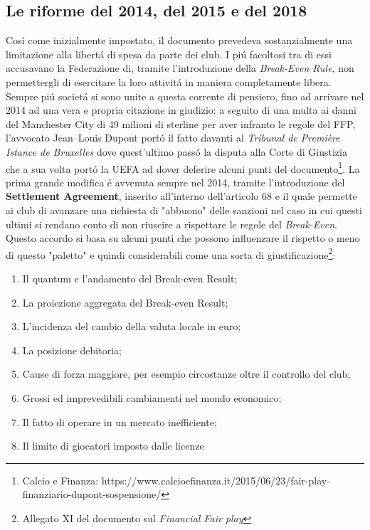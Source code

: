 \documentclass[
    corpo=12pt,
    oneside,
    evenboxes,
    tipotesi=triennale,
    stile=classica,
    oldstyle,
    autoretitolo,
    greek,
]{toptesi}
\begin{document}
\begin{interlinea}{1.5}
\subsection{Le riforme del 2014, del 2015 e del 2018}
Cos\'i come inizialmente impostato, il documento prevedeva sostanzialmente una limitazione alla libert\'a di spesa da parte dei club. 
I pi\'u facoltosi tra di essi accusavano la Federazione di, tramite l'introduzione della \emph{Break-Even Rule}, non permettergli di 
esercitare la loro attivit\'a in maniera completamente libera. Sempre pi\'u societ\'a si sono unite a questa corrente di pensiero,
fino ad arrivare nel 2014 ad una vera e propria citazione in giudizio: a seguito di una multa ai danni del Manchester City di 49 milioni di sterline per aver infranto 
le regole del FFP, l'avvocato Jean–Louis Dupont port\'o il fatto davanti al \emph{Tribunal de Première Istance de Bruxelles} dove quest'ultimo pass\'o la disputa alla 
Corte di Giustizia che a sua volta port\'o la UEFA ad dover deferire alcuni punti del documento\footnote{Calcio e Finanza: https://www.calcioefinanza.it/2015/06/23/fair-play-finanziario-dupont-sospensione/}.\newline
La prima grande modifica \'e avvenuta sempre nel 2014, tramite l'introduzione del \textbf{Settlement Agreement}, inserito all'interno dell'articolo 68 e il quale permette
ai club di avanzare una richiesta di "abbuono" delle sanzioni nel caso in cui questi ultimi si rendano conto di non riuscire a rispettare le regole del 
\emph{Break-Even}. Questo accordo si basa su alcuni punti che possono influenzare il rispetto o meno di questo "paletto" e quindi considerabili
come una sorta di giustificazione\footnote{Allegato XI del documento sul \emph{Financial Fair play}}:
\begin{enumerate}
    \item Il quantum e l’andamento del Break-even Result;
    \item La proiezione aggregata del Break-even Result;
    \item L’incidenza del cambio della valuta locale in euro;
    \item La posizione debitoria;
    \item Cause di forza maggiore, per esempio circostanze oltre il controllo del club;
    \item Grossi ed imprevedibili cambiamenti nel mondo economico;
    \item Il fatto di operare in un mercato inefficiente;
    \item Il limite di giocatori imposto dalle licenze

\end{enumerate}
\end{interlinea}
\end{document}
